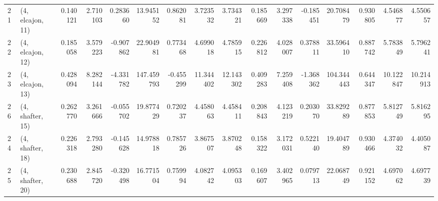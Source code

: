 \begin{tabular}{llrrrrrrrrrrrrrr}
21 &  (4, elcajon, 11) &   0.140121 &  2.710103 &  0.283660 &   13.945152 &  0.862081 &   3.723532 &   3.734321 &  0.185669 &  3.297338 & -0.185451 &   20.708479 &  0.930805 &   4.546877 &   4.550657 \\
22 &  (4, elcajon, 12) &   0.185058 &  3.579223 & -0.907862 &   22.904981 &  0.773468 &   4.699018 &   4.785915 &  0.226812 &  4.028007 &  0.378811 &   33.596410 &  0.887742 &   5.783849 &   5.796241 \\
23 &  (4, elcajon, 13) &   0.428094 &  8.282144 & -4.331782 &  147.459793 & -0.455299 &  11.344402 &  12.143302 &  0.409283 &  7.259408 & -1.368362 &  104.344443 &  0.644347 &  10.122847 &  10.214913 \\
26 &  (4, shafter, 15) &   0.262770 &  3.261666 & -0.055702 &   19.877429 &  0.720237 &   4.458063 &   4.458411 &  0.208843 &  4.123219 &  0.203070 &   33.829289 &  0.877853 &   5.812749 &   5.816295 \\
24 &  (4, shafter, 18) &   0.226318 &  2.793280 & -0.145628 &   14.978818 &  0.785726 &   3.867507 &   3.870248 &  0.158322 &  3.172031 &  0.522140 &   19.404789 &  0.930466 &   4.374032 &   4.405087 \\
25 &  (4, shafter, 20) &   0.230688 &  2.845720 & -0.320498 &   16.771504 &  0.759994 &   4.082742 &   4.095303 &  0.169607 &  3.402965 &  0.079713 &   22.068749 &  0.921152 &   4.697062 &   4.697739 \\
\bottomrule
\end{tabular}
